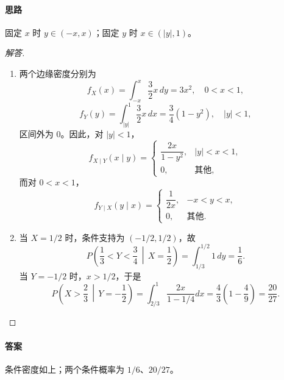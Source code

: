 \paragraph{思路}固定 $x$ 时 $y\in(-x,x)$；固定 $y$ 时 $x\in(|y|,1)$。
\begin{proof}[解答]
\begin{enumerate}
\item 两个边缘密度分别为
\[
f_X(x)=\int_{-x}^x\frac32x\,dy=3x^2,\quad0<x<1,
\]
\[
f_Y(y)=\int_{|y|}^1\frac32x\,dx=\frac34(1-y^2),\quad |y|<1,
\]
区间外为 $0$。因此，对 $|y|<1$，
\[
f_{X\mid Y}(x\mid y)=\begin{cases}\dfrac{2x}{1-y^2},&|y|<x<1,\\0,&\text{其他},\end{cases}
\]
而对 $0<x<1$，
\[
f_{Y\mid X}(y\mid x)=\begin{cases}\dfrac1{2x},&-x<y<x,\\0,&\text{其他}.\end{cases}
\]
\item 当 $X=1/2$ 时，条件支持为 $(-1/2,1/2)$，故
\[
P\left(\frac13<Y<\frac34\,\middle|\,X=\frac12\right)
=\int_{1/3}^{1/2}1\,dy=\frac16.
\]
当 $Y=-1/2$ 时，$x>1/2$，于是
\[
P\left(X>\frac23\,\middle|\,Y=-\frac12\right)
=\int_{2/3}^1\frac{2x}{1-1/4}dx
=\frac43\left(1-\frac49\right)=\frac{20}{27}.
\]
\end{enumerate}
\end{proof}
\paragraph{答案}条件密度如上；两个条件概率为 $1/6$、$20/27$。
